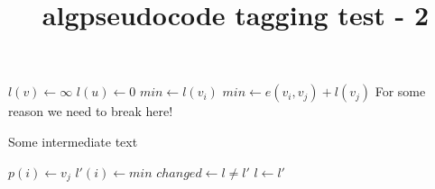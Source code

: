 \documentclass{article}
\title{algpseudocode tagging test - 2}
\begin{document}
\begin{algorithmic}[1]
\State $l(v) \leftarrow \infty$
\EndFor
\State $l(u) \leftarrow 0$
\Repeat
{}
\State $min \leftarrow l(v_i)$
\State $min \leftarrow e(v_i, v_j) + l(v_j)$
\State \Comment For some reason we need to break here!
\end{algorithmic}

Some intermediate text

\begin{algorithmic}[1]
\State $p(i) \leftarrow v_j$
\EndIf
\EndFor
\State $l'(i) \leftarrow min$
\EndFor
\State $changed \leftarrow l \not= l'$
\State $l \leftarrow l'$
\EndProcedure
\end{algorithmic}
\end{document}
